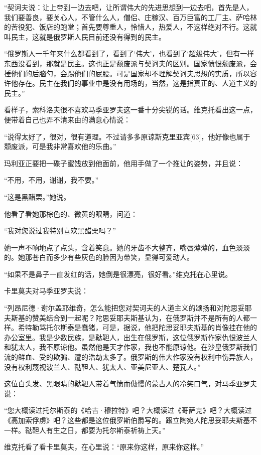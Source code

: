 “契诃夫说：让上帝到一边去吧，让所谓伟大的先进思想到一边去吧，首先是人，我们要善良，要关心人，不管什么人，僧侣、庄稼汉、百万巨富的工厂主、萨哈林的苦役犯、饭店的跑堂；首先要尊重人，怜惜人，热爱人，不这样绝对不行。这就叫民主，这就是俄罗斯人民目前还没有得到的民主。

“俄罗斯人一千年来什么都看到了，看到了‘伟大’，也看到了‘超级伟大’，但有一样东西没看到，那就是民主。这也正是颓废派与契诃夫的区别。国家愤恨颓废派，会捶他们的后脑勺，会踢他们的屁股。可是国家却不理解契诃夫思想的实质，所以容许他存在。民主在我们的事业中是没有用场的，当然，这是指真正的、人道主义的民主。”

看样子，索科洛夫很不喜欢马季亚罗夫这一番十分尖锐的话。维克托看出这一点，便带着自己也弄不清来由的满意心情说：

“说得太好了，很对，很有道理。不过请多多原谅斯克里亚宾[63]，他好像也属于颓废派，可是我非常喜欢他的乐曲。”

玛利亚正要把一碟子蜜饯放到他面前，他用手做了一个推让的姿势，并且说：

“不用，不用，谢谢，我不要。”

“这是黑醋栗。”她说。

他看了看她那棕色的、微黄的眼睛，问道：

“我对您说过我特别喜欢黑醋栗吗？”

她一声不响地点了点头，含着笑意。她的牙齿不大整齐，嘴唇薄薄的，血色淡淡的。她那苍白而多少有些灰色的脸因为带笑，显得可爱动人。

“如果不是鼻子一直发红的话，她倒是很漂亮，很好看。”维克托在心里说。

卡里莫夫对马季亚罗夫说：

“列昂尼德·谢尔盖耶维奇，怎么能把您对契诃夫的人道主义的颂扬和对陀思妥耶夫斯基的赞美结合到一起呢？陀思妥耶夫斯基认为，在俄罗斯并不是所有的人都一样。希特勒骂托尔斯泰是蠢猪，可是，据说，他把陀思妥耶夫斯基的肖像挂在他的办公室里。我是少数民族，是鞑靼人，出生在俄罗斯，这位俄罗斯作家仇恨波兰人和犹太人，我不原谅他。虽然他是天才作家，我也不能原谅他。在沙皇俄罗斯我们流的鲜血、受的欺骗、遭的浩劫太多了。俄罗斯的伟大作家没有权利中伤异族人，没有权利蔑视波兰人、鞑靼人、犹太人、亚美尼亚人、楚瓦人。”

这位白头发、黑眼睛的鞑靼人带着气愤而傲慢的蒙古人的冷笑口气，对马季亚罗夫说：

“您大概读过托尔斯泰的《哈吉·穆拉特》吧？大概读过《哥萨克》吧？大概读过《高加索俘虏》吧？这些都是这位俄罗斯伯爵写的。跟立陶宛人陀思妥耶夫斯基不一样。鞑靼人有生之日，都要为托尔斯泰祈祷上天。”

维克托看了看卡里莫夫，在心里说：“原来你这样，原来你这样。”

